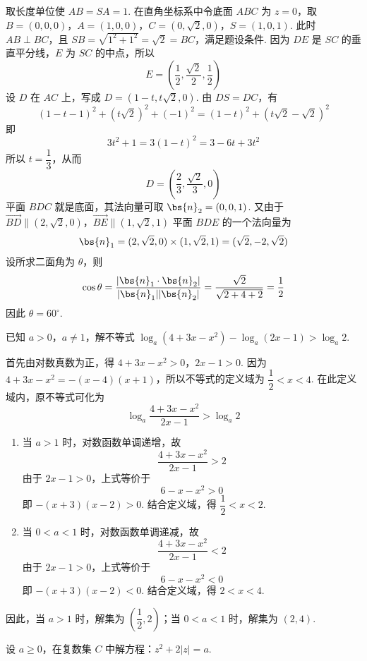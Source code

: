 \begin{solution}
取长度单位使 \(AB=SA=1\). 在直角坐标系中令底面 \(ABC\) 为 \(z=0\)，取
\(B=(0,0,0)\)，\(A=(1,0,0)\)，\(C=(0,\sqrt{2},0)\)，\(S=(1,0,1)\).
此时 \(AB\perp BC\)，且 \(SB=\sqrt{1^2+1^2}=\sqrt{2}=BC\)，满足题设条件. 因为 \(DE\) 是 \(SC\) 的垂直平分线，\(E\) 为 \(SC\) 的中点，所以
\[
E=\left(\frac{1}{2},\frac{\sqrt{2}}{2},\frac{1}{2}\right)
\]
设 \(D\) 在 \(AC\) 上，写成 \(D=(1-t,t\sqrt{2},0)\). 由 \(DS=DC\)，有
\[
\left(1-t-1\right)^2+(t\sqrt{2})^2+(-1)^2
=\left(1-t\right)^2+(t\sqrt{2}-\sqrt{2})^2
\]
即
\[
3t^2+1=3(1-t)^2=3-6t+3t^2
\]
所以 \(t=\dfrac{1}{3}\)，从而
\[
D=\left(\frac{2}{3},\frac{\sqrt{2}}{3},0\right)
\]
平面 \(BDC\) 就是底面，其法向量可取 \(\bs{n}_2=(0,0,1)\). 又由于
\(\overrightarrow{BD}\parallel(2,\sqrt{2},0)\)，\(\overrightarrow{BE}\parallel(1,\sqrt{2},1)\)
平面 \(BDE\) 的一个法向量为
\[
\bs{n}_1=(2,\sqrt{2},0)\times(1,\sqrt{2},1)=(\sqrt{2},-2,\sqrt{2})
\]
设所求二面角为 \(\theta\)，则
\[
\cos\theta=\frac{|\bs{n}_1\cdot\bs{n}_2|}{|\bs{n}_1||\bs{n}_2|}
=\frac{\sqrt{2}}{\sqrt{2+4+2}}=\frac{1}{2}
\]
因此 \(\theta=60^\circ\).
\end{solution}

\begin{problem}
已知 \(a>0\)，\(a\neq 1\)，解不等式 \(\log_a\left( 4+3x-x^2 \right)-\log_a\left( 2x-1 \right)>\log_a 2\).
\end{problem}

\begin{solution}
首先由对数真数为正，得
\(4+3x-x^2>0\)，\(2x-1>0\).
因为 \(4+3x-x^2=-(x-4)(x+1)\)，所以不等式的定义域为 \(\dfrac{1}{2}<x<4\). 在此定义域内，原不等式可化为
\[
\log_a\frac{4+3x-x^2}{2x-1}>\log_a2
\]
\begin{enumerate}
\item 当 \(a>1\) 时，对数函数单调递增，故
\[
\frac{4+3x-x^2}{2x-1}>2
\]
由于 \(2x-1>0\)，上式等价于
\[
6-x-x^2>0
\]
即 \(-(x+3)(x-2)>0\). 结合定义域，得 \(\dfrac{1}{2}<x<2\).

\item 当 \(0<a<1\) 时，对数函数单调递减，故
\[
\frac{4+3x-x^2}{2x-1}<2
\]
由于 \(2x-1>0\)，上式等价于
\[
6-x-x^2<0
\]
即 \(-(x+3)(x-2)<0\). 结合定义域，得 \(2<x<4\).
\end{enumerate}
因此，当 \(a>1\) 时，解集为 \(\left(\dfrac{1}{2},2\right)\)；当 \(0<a<1\) 时，解集为 \((2,4)\).
\end{solution}

\begin{problem}
设 \(a\geqslant 0\)，在复数集 \(C\) 中解方程：\(z^2+2\left| z \right|=a\).
\end{problem}


